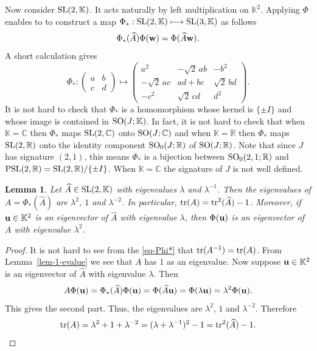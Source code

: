 \documentclass[11pt]{amsart}
\newtheorem{lemma}[theorem]{Lemma}
\numberwithin{equation}{section}
\begin{document}
Now consider ${\rm SL}(2,{\mathbb K})$. It acts naturally by left multiplication on ${\mathbb K}^2$. Applying $\Phi$
enables to to construct a map $\Phi_*:{\rm SL}(2,{\mathbb K}) \longmapsto {\rm SL}(3,{\mathbb K})$ as follows
$$
\Phi_*(\widehat{A})\Phi({\bf w}) = \Phi(\widehat{A}{\bf w}).
$$
A short calculation gives
\begin{equation}\label{eq-Phi*}
\Phi_*:\left(\begin{matrix} a & b \\ c & d \end{matrix}\right) \longmapsto
\left(\begin{matrix} a^2 & -\sqrt{2}\, ab & -b^2 \\
-\sqrt{2}\,ac & ad+bc & \sqrt{2}\,bd \\
-c^2 & \sqrt{2}\, cd & d^2
\end{matrix}\right).
\end{equation}
It is not hard to check that $\Phi_*$ is a homomorphism whose kernel is $\{\pm I\}$
and whose image is contained in ${\rm SO}(J;{\mathbb K})$. In fact, it is not hard to check that
when ${\mathbb K}={\mathbb C}$ then $\Phi_*$ maps ${\rm SL}(2,{\mathbb C})$ onto
${\rm SO}(J;{\mathbb C})$ and when ${\mathbb K}={\mathbb R}$ then $\Phi_*$ maps ${\rm SL}(2,{\mathbb R})$ onto
the identity component ${\rm SO}_0(J;{\mathbb R})$ of ${\rm SO}(J;{\mathbb R})$. Note that since $J$ has signature $(2,1)$, 
this means $\Phi_*$ is a bijection between ${\rm SO}_0(2,1;{\mathbb R})$ and 
${\rm PSL}(2,{\mathbb R})={\rm SL}(2,{\mathbb R})/\{\pm I\}$.
When ${\mathbb K}={\mathbb C}$ the signature of $J$ is not well defined. 

\begin{lemma}\label{lem-eval-irred}
Let $\widehat{A}\in{\rm SL}(2,{\mathbb K})$ with eigenvalues $\lambda$ and $\lambda^{-1}$. 
Then the eigenvalues of $A=\Phi_*(\widehat{A})$ are $\lambda^2$, $1$ and $\lambda^{-2}$. 
In particular, ${\rm tr}(A)={\rm tr}^2(\widehat{A})-1$. Moreover,
if ${\bf u}\in{\mathbb K}^2$ is an eigenvector of $\widehat{A}$ with eigenvalue $\lambda$, 
then $\Phi({\bf u})$ is an eigenvector of $A$ with eigenvalue $\lambda^2$.
\end{lemma}

\begin{proof}
It is not hard to see from the \eqref{eq-Phi*} that ${\rm tr}(A^{-1})={\rm tr}(A)$. From Lemma~\ref{lem-1-evalue} we see that
$A$ has $1$ as an eigenvalue. Now suppose 
${\bf u}\in{\mathbb K}^2$ is an eigenvector of $\widehat{A}$ with eigenvalue $\lambda$. 
Then
$$
A\Phi({\bf u})=\Phi_*(\widehat{A})\Phi({\bf u})=\Phi(\widehat{A}{\bf u})=\Phi(\lambda{\bf u})=\lambda^2\Phi({\bf u}).
$$
This gives the second part. Thus, the eigenvalues are $\lambda^2$, $1$ and $\lambda^{-2}$.
Therefore 
$$
{\rm tr}(A)=\lambda^2+1+\lambda^{-2}=(\lambda+\lambda^{-1})^2-1={\rm tr}^2(\widehat{A})-1.
$$
\end{proof}
\end{document}
